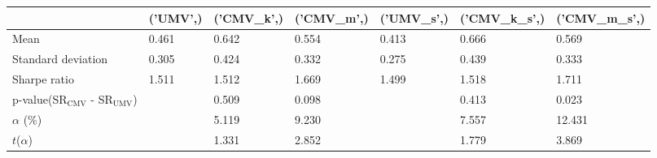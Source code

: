 \begin{tabular}{lllllll}
\toprule
 & ('UMV',) & ('CMV_k',) & ('CMV_m',) & ('UMV_s',) & ('CMV_k_s',) & ('CMV_m_s',) \\
\midrule
Mean & 0.461 & 0.642 & 0.554 & 0.413 & 0.666 & 0.569 \\
Standard deviation & 0.305 & 0.424 & 0.332 & 0.275 & 0.439 & 0.333 \\
Sharpe ratio & 1.511 & 1.512 & 1.669 & 1.499 & 1.518 & 1.711 \\
p-value(SR$_{\text{CMV}}$ - SR$_{\text{UMV}}$) &  & 0.509 & 0.098 &  & 0.413 & 0.023 \\
$\alpha$ (\%) &  & 5.119 & 9.230 &  & 7.557 & 12.431 \\
$t$($\alpha$) &  & 1.331 & 2.852 &  & 1.779 & 3.869 \\
\bottomrule
\end{tabular}
